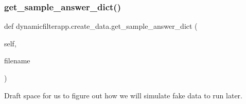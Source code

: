 \mbox{\label{namespacedynamicfilterapp_1_1create__data_aa24df140d2fa59bb933f5488cd72cb31}} 
\subsubsection{\texorpdfstring{get\_sample\_answer\_dict()}{get\_sample\_answer\_dict()}}
{\footnotesize\ttfamily def dynamicfilterapp.\+create\+\_\+data.\+get\+\_\+sample\+\_\+answer\+\_\+dict (\begin{DoxyParamCaption}\item[{}]{self,  }\item[{}]{filename }\end{DoxyParamCaption})}



Draft space for us to figure out how we will simulate fake data to run later. 

